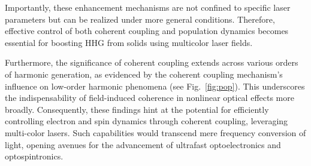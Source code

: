 Importantly, these enhancement mechanisms are not confined to specific laser parameters but can be realized under more general conditions. Therefore, effective control of both coherent coupling and population dynamics becomes essential for boosting HHG from solids using multicolor laser fields.

Furthermore, the significance of coherent coupling extends across various orders of harmonic generation, as evidenced by the coherent coupling mechanism's influence on low-order harmonic phenomena (see Fig.~\ref{fig:pop}). This underscores the indispensability of field-induced coherence in nonlinear optical effects more broadly. Consequently, these findings hint at the potential for efficiently controlling electron and spin dynamics through coherent coupling, leveraging multi-color lasers. Such capabilities would transcend mere frequency conversion of light, opening avenues for the advancement of ultrafast optoelectronics and optospintronics.
